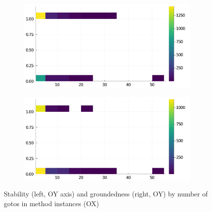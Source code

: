 \begin{figure}[h]
     \begin{subfigure}[b]{0.49\textwidth}
       \includegraphics[width=\textwidth]{figs/all-package-graphs/Gen-gotos-vs-stable.pdf}
     \end{subfigure}
     \begin{subfigure}[b]{0.49\textwidth}
       \includegraphics[width=\textwidth]{figs/all-package-graphs/Gen-gotos-vs-grounded.pdf}
     \end{subfigure}
\caption{Stability (left, OY axis) and groundedness (right, OY) by number of gotos in method instances (OX)}%
%
\label{figs:gotos:Gen}
\end{figure}

